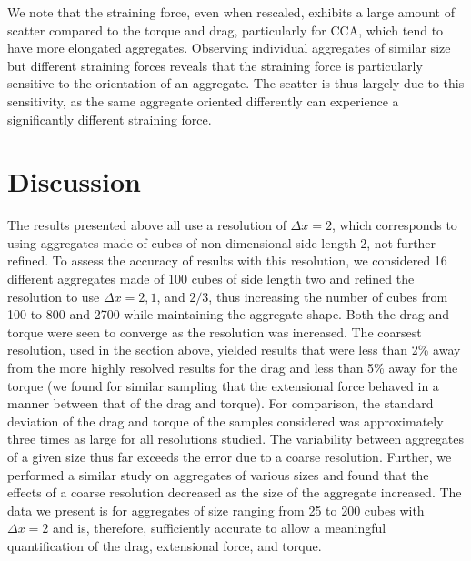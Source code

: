 We note that the straining force, even when rescaled, exhibits a large amount of scatter compared to the torque and drag, particularly for CCA, which tend to have more elongated aggregates. Observing individual aggregates of similar size but different straining forces reveals that the straining force is particularly sensitive to the orientation of an aggregate. The scatter is thus largely due to this sensitivity, as the same aggregate oriented differently can experience a significantly different straining force.

\section{Discussion}
\label{sec:discussion} 

The results presented above all use a resolution of $\Delta x=2$, which corresponds to using aggregates made of cubes of non-dimensional side length 2, not further refined. To assess the accuracy of results with this resolution, we considered 16 different aggregates made of 100 cubes of side length two and refined the resolution to use $\Delta x = 2, 1$, and $2/3$, thus increasing the number of cubes from 100 to 800 and 2700 while maintaining the aggregate shape.  
Both the drag and torque were seen to converge as the resolution was increased. The coarsest resolution, used in the section above, yielded results that were less than 2\% away from the more highly resolved results for the drag and less than 5\% away for the torque (we found for similar sampling that the extensional force behaved in a manner between that of the drag and torque).  For comparison, the standard deviation of the drag and torque of the samples considered was approximately three times as large for all resolutions studied. The variability between aggregates of a given size thus far exceeds the error due to a coarse resolution. Further, we performed a similar study on aggregates of various sizes and found that the effects of a coarse resolution decreased as the size of the aggregate increased. 
The data we present is for aggregates of size ranging from 25 to 200 cubes with $\Delta x=2$ and is, therefore, sufficiently accurate to allow a meaningful quantification of the drag, extensional force, and torque. 

